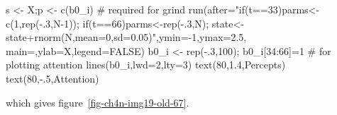 \documentclass[
  a4paper,
  DIV=11,
  numbers=noendperiod,
  oneside]{scrreprt}
\newenvironment{Shaded}{}{}
\newcommand{\AttributeTok}[1]{\textcolor[rgb]{0.84,0.23,0.29}{#1}}
\newcommand{\CommentTok}[1]{\textcolor[rgb]{0.42,0.45,0.49}{#1}}
\newcommand{\ConstantTok}[1]{\textcolor[rgb]{0.00,0.36,0.77}{#1}}
\newcommand{\DecValTok}[1]{\textcolor[rgb]{0.00,0.36,0.77}{#1}}
\newcommand{\FloatTok}[1]{\textcolor[rgb]{0.00,0.36,0.77}{#1}}
\newcommand{\FunctionTok}[1]{\textcolor[rgb]{0.44,0.26,0.76}{#1}}
\newcommand{\NormalTok}[1]{\textcolor[rgb]{0.14,0.16,0.18}{#1}}
\newcommand{\OtherTok}[1]{\textcolor[rgb]{0.44,0.26,0.76}{#1}}
\newcommand{\SpecialCharTok}[1]{\textcolor[rgb]{0.00,0.36,0.77}{#1}}
\newcommand{\StringTok}[1]{\textcolor[rgb]{0.01,0.18,0.38}{#1}}
\begin{document}
\begin{Shaded}
\begin{Highlighting}[]
\NormalTok{s }\OtherTok{\textless{}{-}}\NormalTok{ X;p }\OtherTok{\textless{}{-}} \FunctionTok{c}\NormalTok{(b0\_i) }\CommentTok{\# required for grind}
\FunctionTok{run}\NormalTok{(}\AttributeTok{after=}\StringTok{"if(t==33)parms\textless{}{-}c(1,rep({-}.3,N{-}1));}
\StringTok{           if(t==66)parms\textless{}{-}rep({-}.3,N);}
\StringTok{           state\textless{}{-}state+rnorm(N,mean=0,sd=0.05)"}\NormalTok{,}\AttributeTok{ymin=}\SpecialCharTok{{-}}\DecValTok{1}\NormalTok{,}\AttributeTok{ymax=}\FloatTok{2.5}\NormalTok{,}
            \AttributeTok{main=}\StringTok{\textquotesingle{}\textquotesingle{}}\NormalTok{,}\AttributeTok{ylab=}\StringTok{\textquotesingle{}X\textquotesingle{}}\NormalTok{,}\AttributeTok{legend=}\ConstantTok{FALSE}\NormalTok{)}
\NormalTok{b0\_i }\OtherTok{\textless{}{-}} \FunctionTok{rep}\NormalTok{(}\SpecialCharTok{{-}}\NormalTok{.}\DecValTok{3}\NormalTok{,}\DecValTok{100}\NormalTok{); b0\_i[}\DecValTok{34}\SpecialCharTok{:}\DecValTok{66}\NormalTok{]}\OtherTok{=}\DecValTok{1} \CommentTok{\# for plotting attention}
\FunctionTok{lines}\NormalTok{(b0\_i,}\AttributeTok{lwd=}\DecValTok{2}\NormalTok{,}\AttributeTok{lty=}\DecValTok{3}\NormalTok{)}
\FunctionTok{text}\NormalTok{(}\DecValTok{80}\NormalTok{,}\FloatTok{1.4}\NormalTok{,}\StringTok{\textquotesingle{}Percepts\textquotesingle{}}\NormalTok{)}
\FunctionTok{text}\NormalTok{(}\DecValTok{80}\NormalTok{,}\SpecialCharTok{{-}}\NormalTok{.}\DecValTok{5}\NormalTok{,}\StringTok{\textquotesingle{}Attention\textquotesingle{}}\NormalTok{)}
\end{Highlighting}
\end{Shaded}

which gives figure~\ref{fig-ch4n-img19-old-67}.
\end{document}
